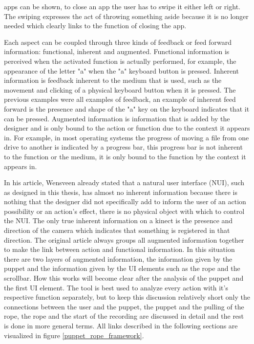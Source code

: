 apps can be shown, to close an app the user has to swipe it either left or right. The swiping expresses the act of throwing something aside because it is no longer needed which clearly links to the function of closing the app.

Each aspect can be coupled through three kinds of feedback or feed forward information: functional, inherent and augmented. Functional information is perceived when the activated function is actually performed, for example, the appearance of the letter "a" when the "a" keyboard button is pressed. Inherent information is feedback inherent to the medium that is used, such as the movement and clicking of a physical keyboard button when it is pressed. The previous examples were all examples of feedback, an example of inherent feed forward is the presence and shape of the "a" key on the keyboard indicates that it can be pressed. Augmented information is information that is added by the designer and is only bound to the action or function due to the context it appears in. For example, in most operating systems the progress of moving a file from one drive to another is indicated by a progress bar, this progress bar is not inherent to the function or the medium, it is only bound to the function by the context it appears in.

In his article, Wensveen already stated that a natural user interface (NUI), such as designed in this thesis, has almost no inherent information because there is nothing that the designer did not specifically add to inform the user of an action possibility or an action's effect, there is no physical object with which to control the NUI. The only true inherent information on a kinect is the presence and direction of the camera which indicates that something is registered in that direction. The original article always groups all augmented information together to make the link between action and functional information. In this situation there are two layers of augmented information, the information given by the puppet and the information given by the UI elements such as the rope and the scrollbar. How this works will become clear after the analysis of the puppet and the first UI element. The tool is best used to analyze every action with it's respective function separately,  but to keep this discussion relatively short only the connections between the user and the puppet, the puppet and the pulling of the rope, the rope and the start of the recording are discussed in detail and the rest is done in more general terms. All links described in the following sections are visualized in figure \ref{puppet_rope_framework}.

